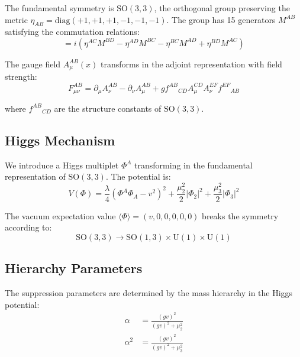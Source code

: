\documentclass[12pt,a4paper]{article}
\newcommand{\SO}{\text{SO}}
\newcommand{\U}{\text{U}}
\begin{document}
The fundamental symmetry is $\SO(3,3)$, the orthogonal group preserving the metric $\eta_{AB} = \text{diag}(+1,+1,+1,-1,-1,-1)$. The group has 15 generators $M^{AB}$ satisfying the commutation relations:
\begin{equation}
[M^{AB}, M^{CD}] = i(\eta^{AC}M^{BD} - \eta^{AD}M^{BC} - \eta^{BC}M^{AD} + \eta^{BD}M^{AC})
\label{eq:so33_algebra}
\end{equation}

The gauge field $A_\mu^{AB}(x)$ transforms in the adjoint representation with field strength:
\begin{equation}
F_{\mu\nu}^{AB} = \partial_\mu A_\nu^{AB} - \partial_\nu A_\mu^{AB} + g f^{AB}{}_{CD} A_\mu^{CD} A_\nu^{EF} f^{EF}{}_{AB}
\label{eq:field_strength}
\end{equation}

where $f^{AB}{}_{CD}$ are the structure constants of $\SO(3,3)$.

\subsection{Higgs Mechanism}

We introduce a Higgs multiplet $\Phi^A$ transforming in the fundamental representation of $\SO(3,3)$. The potential is:
\begin{equation}
V(\Phi) = \frac{\lambda}{4}\left(\Phi^A\Phi_A - v^2\right)^2 + \frac{\mu_2^2}{2}|\Phi_2|^2 + \frac{\mu_3^2}{2}|\Phi_3|^2
\label{eq:higgs_potential}
\end{equation}

The vacuum expectation value $\langle\Phi\rangle = (v, 0, 0, 0, 0, 0)$ breaks the symmetry according to:
\begin{equation}
\SO(3,3) \to \SO(1,3) \times \U(1) \times \U(1)
\label{eq:symmetry_breaking}
\end{equation}

\subsection{Hierarchy Parameters}

The suppression parameters are determined by the mass hierarchy in the Higgs potential:
\begin{align}
\alpha &= \frac{(gv)^2}{(gv)^2 + \mu_2^2} \label{eq:alpha_def}\\
\alpha^2 &= \frac{(gv)^2}{(gv)^2 + \mu_3^2} \label{eq:alpha2_def}
\end{align}
\end{document}
